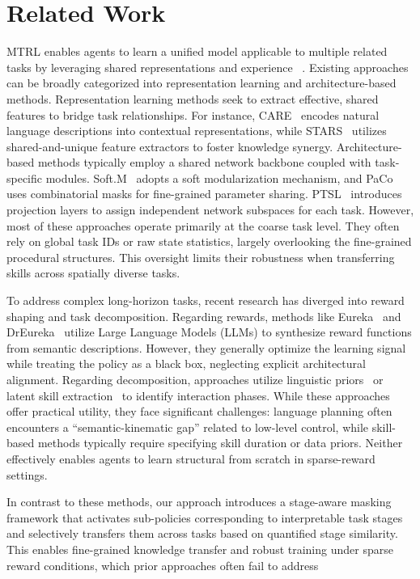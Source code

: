 \documentclass{article}
\begin{document}
\section{Related Work}
MTRL enables agents to learn a unified model applicable to multiple related tasks by leveraging shared representations and experience ~\cite{q10,q65}. 
Existing approaches can be broadly categorized into representation learning and architecture-based methods. 
Representation learning methods seek to extract effective, shared features to bridge task relationships. 
For instance, CARE~\cite{q69} encodes natural language descriptions into contextual representations, while STARS~\cite{i5} utilizes shared-and-unique feature extractors to foster knowledge synergy. 
Architecture-based methods typically employ a shared network backbone coupled with task-specific modules. 
Soft.M~\cite{q51} adopts a soft modularization mechanism, and PaCo~\cite{q36} uses combinatorial masks for fine-grained parameter sharing. 
PTSL~\cite{q43} introduces projection layers to assign independent network subspaces for each task.
However, most of these approaches operate primarily at the coarse task level. They often rely on global task IDs or raw state statistics, largely overlooking the fine-grained procedural structures. 
This oversight limits their robustness when transferring skills across spatially diverse tasks.

To address complex long-horizon tasks, recent research has diverged into reward shaping and task decomposition. Regarding rewards, methods like Eureka~\cite{q86} and DrEureka~\cite{q87} utilize Large Language Models (LLMs) to synthesize reward functions from semantic descriptions. 
However, they generally optimize the learning signal while treating the policy as a black box, neglecting explicit architectural alignment. 
Regarding decomposition, approaches utilize linguistic priors~\cite{i9,i8} or latent skill extraction~\cite{i7,i6} to identify interaction phases. 
While these approaches offer practical utility, they face significant challenges: language planning often encounters a “semantic-kinematic gap” related to low-level control, while skill-based methods typically require specifying skill duration or data priors.
Neither effectively enables agents to learn structural from scratch in sparse-reward settings.


In contrast to these methods, our approach introduces a stage-aware masking framework that activates sub-policies corresponding to interpretable task stages and selectively transfers them across tasks based on quantified stage similarity.
This enables fine-grained knowledge transfer and robust training under sparse reward conditions, which prior approaches often fail to address
\end{document}
